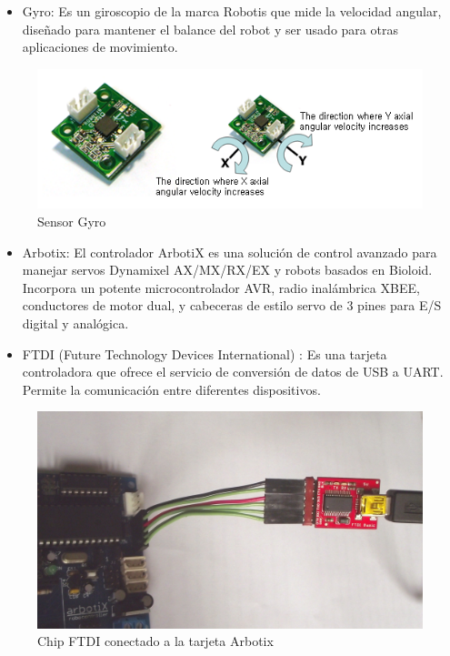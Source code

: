 \begin{itemize}
\item Gyro: Es un giroscopio de la marca Robotis que mide la velocidad angular, diseñado para mantener el balance del robot y ser usado para otras aplicaciones de movimiento. 

\end{itemize}

\begin{figure}[hbtp]
\centering
\includegraphics[scale=0.5]{imagenes/gyro.png}
\caption{Sensor Gyro }
\end{figure}

\begin{itemize}
\item Arbotix: El controlador ArbotiX es una solución de control avanzado para manejar servos Dynamixel AX/MX/RX/EX y robots basados en Bioloid. Incorpora un potente microcontrolador AVR, radio inalámbrica XBEE, conductores de motor dual, y cabeceras de estilo servo de 3 pines para E/S digital y analógica.\cite{arbotix}

\end{itemize}


\begin{itemize}
\item FTDI (Future Technology Devices International) : Es una tarjeta controladora que ofrece el servicio de conversión de datos de USB a UART. Permite la comunicación entre diferentes dispositivos. 


\end{itemize}
\begin{figure}[hbtp]

\centering
\includegraphics[scale=0.09]{imagenes/DSCF1162.jpg}
\caption{Chip FTDI conectado a la tarjeta Arbotix }
\end{figure}



